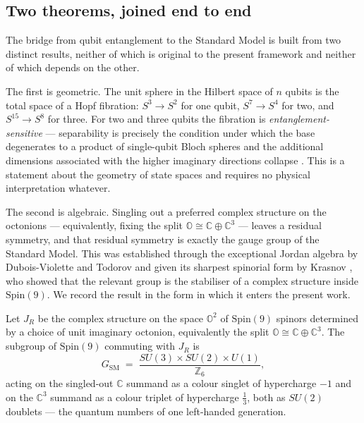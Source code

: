 \subsection{Two theorems, joined end to end}

The bridge from qubit entanglement to the Standard Model is built from two distinct results,
neither of which is original to the present framework and neither of which depends on the other.

The first is geometric. The unit sphere in the Hilbert space of $n$ qubits is the total space of
a Hopf fibration: $S^3 \to S^2$ for one qubit, $S^7 \to S^4$ for two, and $S^{15} \to S^8$ for
three. For two and three qubits the fibration is \emph{entanglement-sensitive} --- separability
is precisely the condition under which the base degenerates to a product of single-qubit Bloch
spheres and the additional dimensions associated with the higher imaginary directions collapse
\autocite{mosseri2001hopf,bernevigchen2003geometry}. This is a statement about the geometry of
state spaces and requires no physical interpretation whatever.

The second is algebraic. Singling out a preferred complex structure on the octonions ---
equivalently, fixing the split $\mathbb{O} \cong \mathbb{C} \oplus \mathbb{C}^3$ --- leaves a
residual symmetry, and that residual symmetry is exactly the gauge group of the Standard Model.
This was established through the exceptional Jordan algebra by Dubois-Violette and Todorov
\autocite{duboisviolette2016exceptional,duboisviolettetodorov2019exceptional,todorovduboisviolette2018deducing}
and given its sharpest spinorial form by Krasnov \autocite{krasnov2021so9}, who showed that the
relevant group is the stabiliser of a complex structure inside $\mathrm{Spin}(9)$. We record the
result in the form in which it enters the present work.

\begin{proposition}\label{prop:gsm} Let $J_R$ be the complex
structure on the space $\mathbb{O}^2$ of $\mathrm{Spin}(9)$ spinors determined by a choice of
unit imaginary octonion, equivalently the split
$\mathbb{O} \cong \mathbb{C} \oplus \mathbb{C}^3$. The subgroup of $\mathrm{Spin}(9)$ commuting
with $J_R$ is \[ G_{\mathrm{SM}} \;=\; \frac{SU(3) \times SU(2) \times U(1)}{\mathbb{Z}_6}, \]
acting on the singled-out $\mathbb{C}$ summand as a colour singlet of hypercharge $-1$ and on
the $\mathbb{C}^3$ summand as a colour triplet of hypercharge $\tfrac{1}{3}$, both as $SU(2)$
doublets --- the quantum numbers of one left-handed generation.
\end{proposition}

